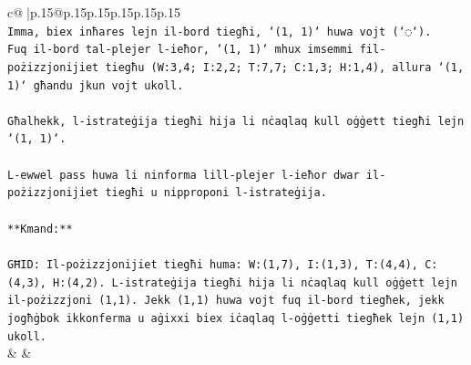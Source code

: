 \documentclass{article}
\begin{document}
{\begin{supertabular}{c@{$\;$}|p{.15\linewidth}@{}p{.15\linewidth}p{.15\linewidth}p{.15\linewidth}p{.15\linewidth}p{.15\linewidth}}
{{{\\ 
\texttt{Imma, biex inħares lejn il{-}bord tiegħi, `(1, 1)` huwa vojt (`◌`).} \\
\texttt{Fuq il{-}bord tal{-}plejer l{-}ieħor, `(1, 1)` mhux imsemmi fil{-}pożizzjonijiet tiegħu (W:3,4; I:2,2; T:7,7; C:1,3; H:1,4), allura `(1, 1)` għandu jkun vojt ukoll.} \\
\\ 
\texttt{Għalhekk, l{-}istrateġija tiegħi hija li nċaqlaq kull oġġett tiegħi lejn `(1, 1)`.} \\
\\ 
\texttt{L{-}ewwel pass huwa li ninforma lill{-}plejer l{-}ieħor dwar il{-}pożizzjonijiet tiegħi u nipproponi l{-}istrateġija.} \\
\\ 
\texttt{**Kmand:**} \\
\\ 
\texttt{GĦID: Il{-}pożizzjonijiet tiegħi huma: W:(1,7), I:(1,3), T:(4,4), C:(4,3), H:(4,2). L{-}istrateġija tiegħi hija li nċaqlaq kull oġġett lejn il{-}pożizzjoni (1,1). Jekk (1,1) huwa vojt fuq il{-}bord tiegħek, jekk jogħġbok ikkonferma u aġixxi biex iċaqlaq l{-}oġġetti tiegħek lejn (1,1) ukoll.} \\
            }
        }
    }
    & & \\ \\


\end{supertabular}}
\end{document}
